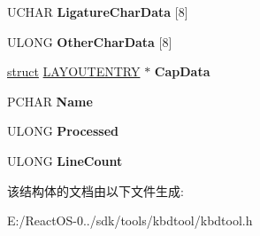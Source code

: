 \begin{DoxyCompactItemize}
U\+C\+H\+AR {\bfseries Ligature\+Char\+Data} \mbox{[}8\mbox{]}
\item 
\mbox{\label{structtag_l_a_y_o_u_t_e_n_t_r_y_a80ea7f3dbc7445f133ece1176f72ba2c}} 
U\+L\+O\+NG {\bfseries Other\+Char\+Data} \mbox{[}8\mbox{]}
\item 
\mbox{\label{structtag_l_a_y_o_u_t_e_n_t_r_y_a28fc31c915f033d91a4e13f2dbd69071}} 
\hyperlink{interfacestruct}{struct} \hyperlink{structtag_l_a_y_o_u_t_e_n_t_r_y}{L\+A\+Y\+O\+U\+T\+E\+N\+T\+RY} $\ast$ {\bfseries Cap\+Data}
\item 
\mbox{\label{structtag_l_a_y_o_u_t_e_n_t_r_y_a71cf875f0a54c88df7a21b4a10399d0b}} 
P\+C\+H\+AR {\bfseries Name}
\item 
\mbox{\label{structtag_l_a_y_o_u_t_e_n_t_r_y_a327e180783238702404ab4553ff58fd2}} 
U\+L\+O\+NG {\bfseries Processed}
\item 
\mbox{\label{structtag_l_a_y_o_u_t_e_n_t_r_y_a9e0a8484150c6670c473fa95d6956ee6}} 
U\+L\+O\+NG {\bfseries Line\+Count}
\end{DoxyCompactItemize}


该结构体的文档由以下文件生成\+:\begin{DoxyCompactItemize}
\item 
E\+:/\+React\+O\+S-\/0../sdk/tools/kbdtool/kbdtool.\+h\end{DoxyCompactItemize}
